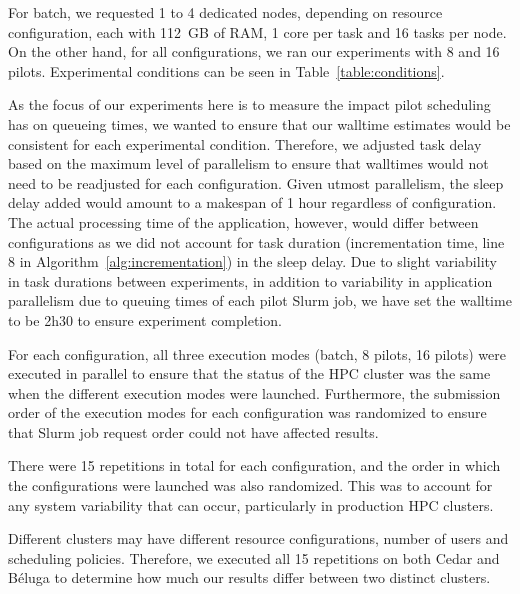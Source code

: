 \documentclass{IEEEtran}
\begin{document}
       For batch, we requested 1 to 4 dedicated nodes, depending on resource 
       configuration, each with 112~GB of RAM, 1 core per task and 16 tasks per 
       node. On the other hand, for all configurations, we ran our experiments
       with 8 and 16 pilots. Experimental conditions can be seen in Table~\ref{table:conditions}.

       As the focus of our experiments here is to measure the impact pilot scheduling
       has on queueing times, we wanted to ensure that our walltime estimates would
       be consistent for each experimental condition. Therefore, we adjusted task 
       delay based on the maximum level of parallelism to ensure that walltimes would
       not need to be readjusted for each configuration. Given utmost parallelism,
       the sleep delay added would amount to a makespan of 1 hour regardless
       of configuration. The actual processing time of the application, however, 
       would differ between configurations as we did not account for task duration (incrementation time, line
       8 in Algorithm~\ref{alg:incrementation})
       in the sleep delay. Due to slight variability in task durations between experiments, in 
       addition to variability in application parallelism due to queuing times of each pilot Slurm job, 
       we have set the walltime to be 2h30 to ensure experiment completion.

       For each configuration, all three execution modes (batch, 8 pilots,
       16 pilots) were executed in parallel to ensure that the status of
       the HPC cluster was the same when the different execution modes
       were launched. Furthermore, the submission order of the execution
       modes for each configuration was randomized to ensure that Slurm job
       request order could not have affected results. 

       There were 15 repetitions in total for each configuration, and the order
       in which the configurations were launched was also randomized. This was to 
       account for any system variability that can occur, particularly in production
       HPC clusters. 

       Different clusters may have different resource configurations, number of 
       users and scheduling policies. Therefore, we executed all 15 repetitions on
       both Cedar and B\'eluga to determine how much our results differ between
       two distinct clusters.

\end{document}
